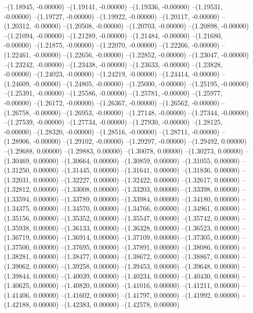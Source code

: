 --(1.18945, -0.00000)
--(1.19141, -0.00000)
--(1.19336, -0.00000)
--(1.19531, -0.00000)
--(1.19727, -0.00000)
--(1.19922, -0.00000)
--(1.20117, -0.00000)
--(1.20312, -0.00000)
--(1.20508, -0.00000)
--(1.20703, -0.00000)
--(1.20898, -0.00000)
--(1.21094, -0.00000)
--(1.21289, -0.00000)
--(1.21484, -0.00000)
--(1.21680, -0.00000)
--(1.21875, -0.00000)
--(1.22070, -0.00000)
--(1.22266, -0.00000)
--(1.22461, -0.00000)
--(1.22656, -0.00000)
--(1.22852, -0.00000)
--(1.23047, -0.00000)
--(1.23242, -0.00000)
--(1.23438, -0.00000)
--(1.23633, -0.00000)
--(1.23828, -0.00000)
--(1.24023, -0.00000)
--(1.24219, -0.00000)
--(1.24414, -0.00000)
--(1.24609, -0.00000)
--(1.24805, -0.00000)
--(1.25000, -0.00000)
--(1.25195, -0.00000)
--(1.25391, -0.00000)
--(1.25586, -0.00000)
--(1.25781, -0.00000)
--(1.25977, -0.00000)
--(1.26172, -0.00000)
--(1.26367, -0.00000)
--(1.26562, -0.00000)
--(1.26758, -0.00000)
--(1.26953, -0.00000)
--(1.27148, -0.00000)
--(1.27344, -0.00000)
--(1.27539, -0.00000)
--(1.27734, -0.00000)
--(1.27930, -0.00000)
--(1.28125, -0.00000)
--(1.28320, -0.00000)
--(1.28516, -0.00000)
--(1.28711, -0.00000)
--(1.28906, -0.00000)
--(1.29102, -0.00000)
--(1.29297, -0.00000)
--(1.29492, 0.00000)
--(1.29688, 0.00000)
--(1.29883, 0.00000)
--(1.30078, 0.00000)
--(1.30273, 0.00000)
--(1.30469, 0.00000)
--(1.30664, 0.00000)
--(1.30859, 0.00000)
--(1.31055, 0.00000)
--(1.31250, 0.00000)
--(1.31445, 0.00000)
--(1.31641, 0.00000)
--(1.31836, 0.00000)
--(1.32031, 0.00000)
--(1.32227, 0.00000)
--(1.32422, 0.00000)
--(1.32617, 0.00000)
--(1.32812, 0.00000)
--(1.33008, 0.00000)
--(1.33203, 0.00000)
--(1.33398, 0.00000)
--(1.33594, 0.00000)
--(1.33789, 0.00000)
--(1.33984, 0.00000)
--(1.34180, 0.00000)
--(1.34375, 0.00000)
--(1.34570, 0.00000)
--(1.34766, 0.00000)
--(1.34961, 0.00000)
--(1.35156, 0.00000)
--(1.35352, 0.00000)
--(1.35547, 0.00000)
--(1.35742, 0.00000)
--(1.35938, 0.00000)
--(1.36133, 0.00000)
--(1.36328, 0.00000)
--(1.36523, 0.00000)
--(1.36719, 0.00000)
--(1.36914, 0.00000)
--(1.37109, 0.00000)
--(1.37305, 0.00000)
--(1.37500, 0.00000)
--(1.37695, 0.00000)
--(1.37891, 0.00000)
--(1.38086, 0.00000)
--(1.38281, 0.00000)
--(1.38477, 0.00000)
--(1.38672, 0.00000)
--(1.38867, 0.00000)
--(1.39062, 0.00000)
--(1.39258, 0.00000)
--(1.39453, 0.00000)
--(1.39648, 0.00000)
--(1.39844, 0.00000)
--(1.40039, 0.00000)
--(1.40234, 0.00000)
--(1.40430, 0.00000)
--(1.40625, 0.00000)
--(1.40820, 0.00000)
--(1.41016, 0.00000)
--(1.41211, 0.00000)
--(1.41406, 0.00000)
--(1.41602, 0.00000)
--(1.41797, 0.00000)
--(1.41992, 0.00000)
--(1.42188, 0.00000)
--(1.42383, 0.00000)
--(1.42578, 0.00000)
